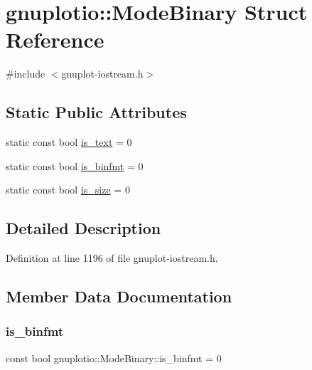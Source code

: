 \hypertarget{structgnuplotio_1_1_mode_binary}{}\section{gnuplotio\+:\+:Mode\+Binary Struct Reference}
\label{structgnuplotio_1_1_mode_binary}


{\ttfamily \#include $<$gnuplot-\/iostream.\+h$>$}

\subsection*{Static Public Attributes}
\begin{DoxyCompactItemize}
\item 
static const bool \hyperlink{structgnuplotio_1_1_mode_binary_ac89064b5df24f7ef4d765fdfde4fd1b6}{is\+\_\+text} = 0
\item 
static const bool \hyperlink{structgnuplotio_1_1_mode_binary_aee724034dc3372b8e12b1187507bf136}{is\+\_\+binfmt} = 0
\item 
static const bool \hyperlink{structgnuplotio_1_1_mode_binary_a6eae25ea662362bbb88bc987d6025290}{is\+\_\+size} = 0
\end{DoxyCompactItemize}


\subsection{Detailed Description}


Definition at line 1196 of file gnuplot-\/iostream.\+h.



\subsection{Member Data Documentation}
\mbox{\label{structgnuplotio_1_1_mode_binary_aee724034dc3372b8e12b1187507bf136}} 
\subsubsection{\texorpdfstring{is\+\_\+binfmt}{is\_binfmt}}
{\footnotesize\ttfamily const bool gnuplotio\+::\+Mode\+Binary\+::is\+\_\+binfmt = 0\hspace{0.3cm}{\ttfamily [static]}}



